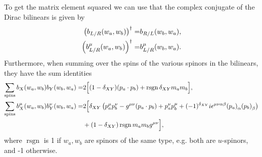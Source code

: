 \documentclass[../main.tex]{subfiles}
\begin{document}
To get the matrix element squared we can use that the complex conjugate of the
Dirac bilinears is given by
\begin{subequations}
	\begin{align}
		\left(b_{L/R}(w_a, w_b)\right)^\dagger =     & b_{R/L}(w_b, w_a),     \\
		\left(b_{L/R}^\mu(w_a, w_b)\right)^\dagger = & b_{L/R}^\mu(w_b, w_a).
	\end{align}
\end{subequations}
Furthermore, when summing over the spins of the various spinors in the bilinears, they have the sum identities
\begin{align}
	\sum_{\text{spins}} b_X(w_a, w_b) b_Y(w_b, w_a) =         & 2 \Big[ (1-\delta_{XY}) (p_a \cdot p_b) + \operatorname{rsgn} \delta_{XY} m_a m_b \Big],                                                                                              \\
	\nonumber
	\sum_{\text{spins}} b_X^\mu(w_a, w_b) b_Y^\nu(w_b, w_a) = & 2\Big[ \delta_{XY}\pclosed{p_a^\mu p_b^\nu - \g (p_a \cdot p_b) + p_a^\nu p_b^\mu + (-1)^{\delta_{XY}} i \epsilon^{\mu\nu\alpha\beta} \tensor{(p_a)}{_\alpha} \tensor{(p_b)}{_\beta}} \\
	                                                          & + (1-\delta_{XY})\operatorname{rsgn} m_a m_b \g \Big],
\end{align}
where \(\operatorname{rsgn}\) is 1 if \(w_a, w_b\) are spinors of the same type, e.g. both are \(u\)-spinors, and -1 otherwise.
\end{document}
